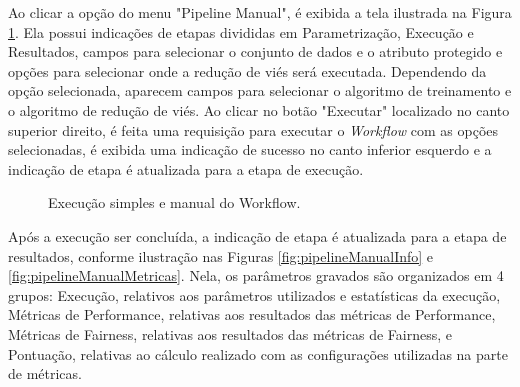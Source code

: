 \documentclass[portugues]{ic-tese}
\begin{document}
Ao clicar a opção do menu "Pipeline Manual", é exibida a tela ilustrada na Figura \ref{fig:pipelineManual}. Ela possui indicações de etapas divididas em Parametrização, Execução e Resultados, campos para selecionar o conjunto de dados e o atributo protegido e opções para selecionar onde a redução de viés será executada. Dependendo da opção selecionada, aparecem campos para selecionar o algoritmo de treinamento e o algoritmo de redução de viés. Ao clicar no botão "Executar" localizado no canto superior direito, é feita uma requisição para executar o \textit{Workflow} com as opções selecionadas, é exibida uma indicação de sucesso no canto inferior esquerdo e a indicação de etapa é atualizada para a etapa de execução.

\begin{figure}[H]
    \centering
    \caption{Execução simples e manual do Workflow.}
    \label{fig:pipelineManual}
\end{figure}

Após a execução ser concluída,  a indicação de etapa é atualizada para a etapa de resultados, conforme ilustração nas Figuras \ref{fig:pipelineManualInfo} e \ref{fig:pipelineManualMetricas}. Nela, os parâmetros gravados são organizados em 4 grupos: Execução, relativos aos parâmetros utilizados e estatísticas da execução, Métricas de Performance, relativas aos resultados das métricas de Performance, Métricas de Fairness, relativas aos resultados das métricas de Fairness, e Pontuação, relativas ao cálculo realizado com as configurações utilizadas na parte de métricas.
\end{document}
